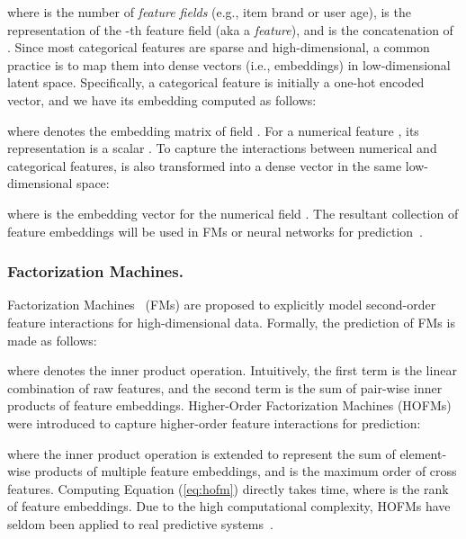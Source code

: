 \documentclass[letterpaper]{article} \usepackage{aaai20}  \usepackage{times}  \usepackage{helvet} \usepackage{courier}  \usepackage[hyphens]{url}  \usepackage{graphicx} \urlstyle{rm} \def\UrlFont{\rm}  \usepackage{graphicx}  \frenchspacing  \setlength{\pdfpagewidth}{8.5in}  \setlength{\pdfpageheight}{11in}
\begin{document}
where  is the number of \emph{feature fields} (e.g., item brand or user age),  is the representation of the -th feature field (aka a \emph{feature}), and  is the concatenation of .
Since most categorical features are sparse and high-dimensional, a common practice is to map them into dense vectors (i.e., embeddings) in low-dimensional latent space. 
Specifically, a categorical feature  is initially a one-hot encoded vector, and we have its embedding  computed as follows:

where  denotes the embedding matrix of field . For a numerical feature , its representation is a scalar . To capture the interactions between numerical and categorical features,  is also transformed into a dense vector in the same low-dimensional space:

where  is the embedding vector for the numerical field . The resultant collection of feature embeddings  will be used in FMs or neural networks for prediction~\cite{DBLP:conf/ijcai/ChengSZH18,DBLP:conf/icdm/LiSZ18}.

\subsubsection{Factorization Machines.}
Factorization Machines~\cite{FM} (FMs) are proposed to explicitly model second-order feature interactions for high-dimensional data.
Formally, the prediction of FMs is made as follows:

where  denotes the inner product operation. Intuitively, the first term  is the linear combination of raw features, and the second term is the sum of pair-wise inner products of feature embeddings.
Higher-Order Factorization Machines (HOFMs) were introduced to capture higher-order feature interactions for prediction:
\small

\normalsize
where the inner product operation is extended to represent the sum of element-wise products of multiple feature embeddings, and  is the maximum order of cross features. 
Computing Equation (\ref{eq:hofm}) directly takes  time, where  is the rank of feature embeddings. Due to the high computational complexity, HOFMs have seldom been applied to real predictive systems~\cite{hofm}.
\end{document}
